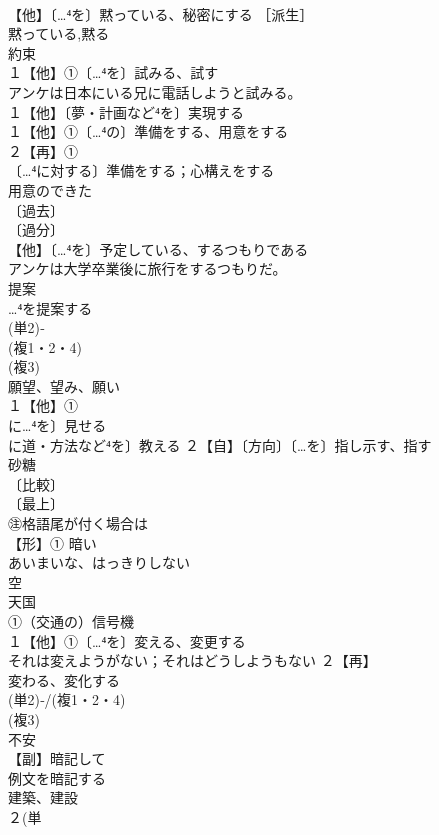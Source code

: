 \documentclass[8pt]{extreport}
\begin{document}
\begin{CJK}{UTF8}{min}
\\	【他】〔…⁴を〕黙っている、秘密にする ［派生］ 
\\	黙っている,黙る
\\	約束 
\\	１【他】①〔…⁴を〕試みる、試す 
\\	アンケは日本にいる兄に電話しようと試みる。
\\	１【他】〔夢・計画など⁴を〕実現する 
\\	１【他】①〔…⁴の〕準備をする、用意をする 
\\	２【再】①
\\	〔…⁴に対する〕準備をする；心構えをする 
\\	用意のできた
\\	〔過去〕
\\	〔過分〕
\\	【他】〔…⁴を〕予定している、するつもりである 
\\	アンケは大学卒業後に旅行をするつもりだ。
\\	提案 
\\	…⁴を提案する
\\	(単2)‐
\\	(複1・2・4)
\\	(複3)
\\	願望、望み、願い 
\\	１【他】①
\\	に…⁴を〕見せる 
\\	に道・方法など⁴を〕教える ２【自】〔方向〕〔…を〕指し示す、指す
\\	砂糖 
\\	〔比較〕
\\	〔最上〕
\\	㊟格語尾が付く場合は 
\\	【形】① 暗い 
\\	あいまいな、はっきりしない
\\	空 
\\	天国
\\	①（交通の）信号機
\\	１【他】①〔…⁴を〕変える、変更する 
\\	それは変えようがない；それはどうしようもない ２【再】
\\	変わる、変化する
\\	(単2)‐/(複1・2・4)
\\	(複3)
\\	不安
\\	【副】暗記して 
\\	例文を暗記する
\\	建築、建設 
\\	２(単

\end{CJK}
\end{document}
